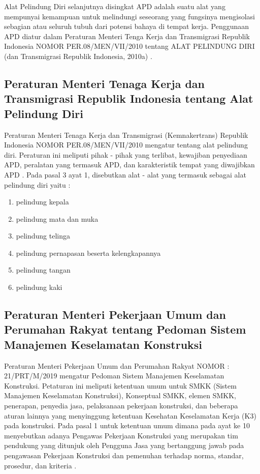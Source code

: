 Alat Pelindung Diri selanjutnya disingkat APD adalah
suatu alat yang mempunyai kemampuan untuk melindungi
seseorang yang fungsinya mengisolasi sebagian atau
seluruh tubuh dari potensi bahaya di tempat kerja.
Penggunaan APD diatur dalam Peraturan Menteri Tenga Kerja
dan Transmigrasi Republik Indonesia NOMOR PER.08/MEN/VII/2010
tentang ALAT PELINDUNG DIRI (dan Transmigrasi Republik Indonesia, 2010a) \cite{suratkementriantenagakerja}.

\subsection{Peraturan Menteri Tenaga Kerja dan Transmigrasi Republik Indonesia tentang Alat Pelindung Diri}
\label{peraturanapd}

Peraturan Menteri Tenaga Kerja dan Transmigrasi (Kemnakertrans) Republik Indonesia NOMOR PER.08/MEN/VII/2010 mengatur tentang alat pelindung diri.
Peraturan ini meliputi pihak - pihak yang terlibat, kewajiban penyediaan APD, peralatan yang termasuk APD, dan karakteristik tempat
yang diwajibkan APD \cite{suratkementriantenagakerja}. Pada pasal 3 ayat 1, disebutkan alat - alat yang termasuk sebagai alat pelindung diri
yaitu :

\begin{enumerate}[nolistsep]
  \item pelindung kepala
  \item pelindung mata dan muka
  \item pelindung telinga
  \item pelindung pernapasan beserta kelengkapannya
  \item pelindung tangan
  \item pelindung kaki
\end{enumerate}

\subsection{Peraturan Menteri Pekerjaan Umum dan Perumahan Rakyat tentang Pedoman Sistem Manajemen Keselamatan Konstruksi}
\label{sec:permenpu_smkk}

\par Peraturan Menteri Pekerjaan Umum dan Perumahan Rakyat NOMOR : 21/PRT/M/2019 mengatur Pedoman Sistem Manajemen Keselamatan Konstruksi.
Petaturan ini meliputi ketentuan umum untuk SMKK (Sistem Manajemen Keselamatan Konstruksi), Konseptual SMKK, elemen SMKK, penerapan, penyedia jasa, pelaksanaan pekerjaan konstruksi,  dan beberapa aturan lainnya yang menyinggung ketentuan Kesehatan Keselamatan Kerja (K3) pada konstruksi. Pada pasal 1 untuk ketentuan umum dimana pada ayat ke 10 menyebutkan adanya Pengawas Pekerjaan Konstruksi yang merupakan tim pendukung yang ditunjuk oleh Pengguna Jasa yang bertanggung jawab pada pengawasan Pekerjaan Konstruksi dan pemenuhan terhadap norma, standar, prosedur, dan kriteria \cite{permen21prtm2019pedomansistemmanajemenkeselamatankonstruksi}.

